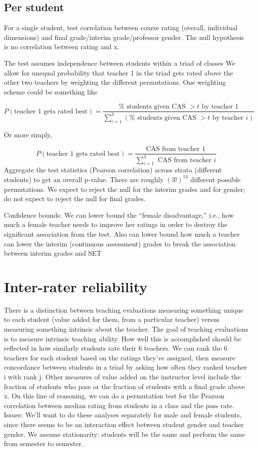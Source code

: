 \documentclass[12pt]{article}
\begin{document}
\subsection{Per student}
For a single student, test correlation between course rating (overall, individual dimensions) and final grade/interim grade/professor gender.
The null hypothesis is no correlation between rating and x.

The test assumes independence between students within a triad of classes
 We allow for unequal probability that teacher 1 in the triad gets rated above the other two teachers by weighting the different permutations. One weighting scheme could be something like

$$P(\text{teacher 1 gets rated best}) = \frac{\%\text{ students given CAS }> t\text{ by teacher 1}}{\sum_{i=1}^3(\%\text{ students given CAS }> t\text{ by teacher }i)}$$
 
Or more simply, 

$$P(\text{teacher 1 gets rated best}) = \frac{\text{CAS from teacher 1}}{\sum_{i=1}^3\text{ CAS from teacher }i}$$
Aggregate the test statistics (Pearson correlation) across strata (different students) to get an overall p-value.  There are roughly $(3!)^{14}$ different possible permutations.
We expect to reject the null for the interim grades and for gender; do not expect to reject the null for final grades.
 
Confidence bounds:
We can lower bound the ``female disadvantage,'' i.e., 
how much a female teacher needs to improve her ratings in order to destroy the 
significant association from the test.
Also can lower bound how much a teacher can lower the interim (continuous assessment) grades to break the association between interim grades and SET

\section{Inter-rater reliability}
There is a distinction between teaching evaluations measuring something unique to each student 
(value added for them, from a particular teacher) versus 
measuring something intrinsic about the teacher.  
The goal of teaching evaluations is to measure intrinsic teaching ability.  
How well this is accomplished should be reflected in how similarly 
students rate their 6 teachers.
We can rank the 6 teachers for each student based on the ratings 
they've assigned, then measure concordance between students in a triad by asking how often they ranked teacher i with rank j.
Other measures of value added on the instructor level include the fraction of 
students who pass or the fraction of students with a final grade above x.  
On this line of reasoning, we can do a permutation test for the 
Pearson correlation between median rating from students in a class and the pass rate.
Issues:
We'll want to do these analyses separately for male and female students, 
since there seems to be an interaction effect between student gender and teacher gender.
We assume stationarity: students will be the same and perform the same from semester to semester.
\end{document}
